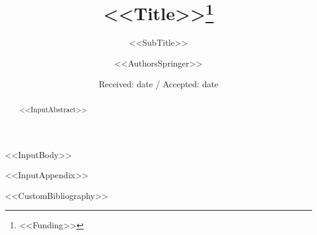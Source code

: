 \documentclass[%
nospthms,
smallextended,
envcountsect,
<<DocumentClassOptions>>]{svjour3}
\begin{document}
\title{<<Title>>\thanks{<<Funding>>}}
\subtitle{<<SubTitle>>}

\dedication{<<Dedication>>}

\author{<<AuthorsSpringer>>}

\date{Received: date / Accepted: date}

\maketitle

\begin{abstract}
<<InputAbstract>>
\end{abstract}



<<InputBody>>

\appendix
<<InputAppendix>>


<<CustomBibliography>>
\end{document}
